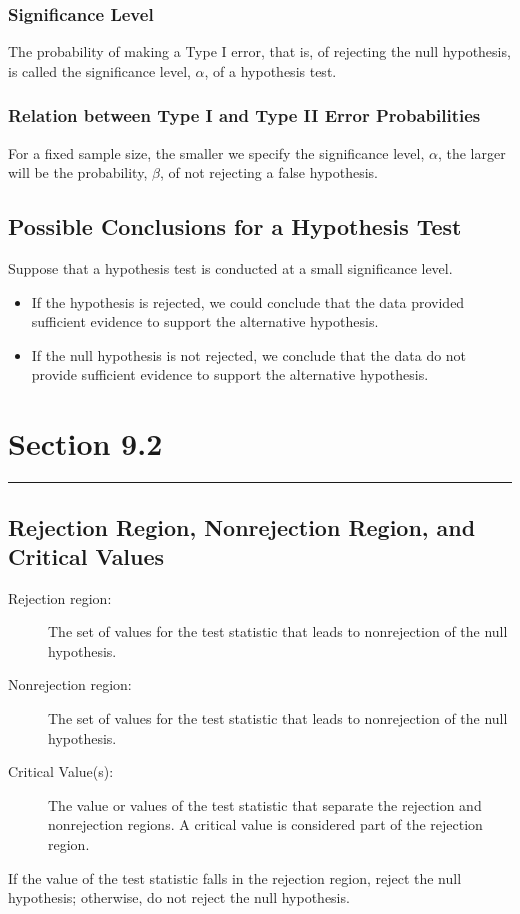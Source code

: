 \documentclass[12pt]{article}
\begin{document}
            \subsubsection*{Significance Level}
                The probability of making a Type I error, that is, of rejecting the null
                hypothesis, is called the significance level, $\alpha$, of a hypothesis test.
            \subsubsection*{Relation between Type I and Type II Error Probabilities}
                For a fixed sample size, the smaller we specify the significance level,
                $\alpha$, the larger will be the probability, $\beta$, of not rejecting a 
                false hypothesis.
        \subsection*{Possible Conclusions for a Hypothesis Test}
            Suppose that a hypothesis test is conducted at a small significance level.
            \begin{itemize}
                \item If the hypothesis is rejected, we could conclude that the data provided
                sufficient evidence to support the alternative hypothesis.
                \item If the null hypothesis is not rejected, we conclude that the data do not
                provide sufficient evidence to support the alternative hypothesis.                 
            \end{itemize}

    \section*{Section 9.2}
    \noindent\rule{\textwidth}{0.4pt}
        \subsection*{Rejection Region, Nonrejection Region, and Critical Values}
            \begin{description}
                \item[Rejection region:] The set of values for the test statistic that leads
                to nonrejection of the null hypothesis.
                \item[Nonrejection region:] The set of values for the test statistic that leads
                to nonrejection of the null hypothesis.
                \item[Critical Value(s):] The value or values of the test statistic that
                separate the rejection and nonrejection regions. A critical value is considered
                part of the rejection region.  
            \end{description}
            If the value of the test statistic falls in the rejection region, reject the null
            hypothesis; otherwise, do not reject the null hypothesis.
\end{document}
